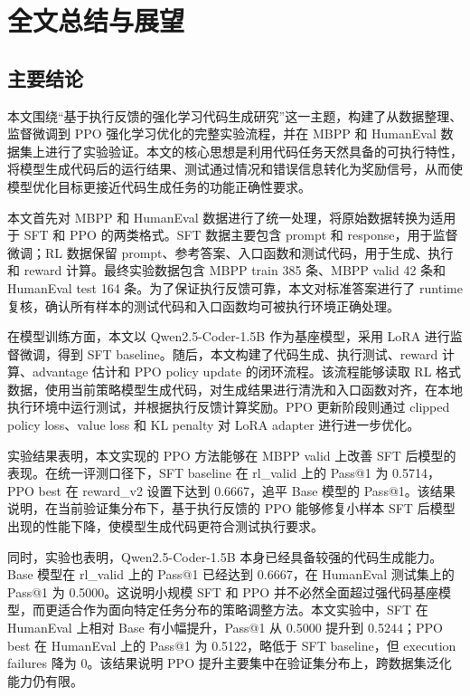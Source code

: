 
\chapter{全文总结与展望}

\section{主要结论}

本文围绕“基于执行反馈的强化学习代码生成研究”这一主题，构建了从数据整理、监督微调到 PPO 强化学习优化的完整实验流程，并在 MBPP 和 HumanEval 数据集上进行了实验验证。本文的核心思想是利用代码任务天然具备的可执行特性，将模型生成代码后的运行结果、测试通过情况和错误信息转化为奖励信号，从而使模型优化目标更接近代码生成任务的功能正确性要求。

本文首先对 MBPP 和 HumanEval 数据进行了统一处理，将原始数据转换为适用于 SFT 和 PPO 的两类格式。SFT 数据主要包含 prompt 和 response，用于监督微调；RL 数据保留 prompt、参考答案、入口函数和测试代码，用于生成、执行和 reward 计算。最终实验数据包含 MBPP train 385 条、MBPP valid 42 条和 HumanEval test 164 条。为了保证执行反馈可靠，本文对标准答案进行了 runtime 复核，确认所有样本的测试代码和入口函数均可被执行环境正确处理。

在模型训练方面，本文以 Qwen2.5-Coder-1.5B 作为基座模型，采用 LoRA 进行监督微调，得到 SFT baseline。随后，本文构建了代码生成、执行测试、reward 计算、advantage 估计和 PPO policy update 的闭环流程。该流程能够读取 RL 格式数据，使用当前策略模型生成代码，对生成结果进行清洗和入口函数对齐，在本地执行环境中运行测试，并根据执行反馈计算奖励。PPO 更新阶段则通过 clipped policy loss、value loss 和 KL penalty 对 LoRA adapter 进行进一步优化。

实验结果表明，本文实现的 PPO 方法能够在 MBPP valid 上改善 SFT 后模型的表现。在统一评测口径下，SFT baseline 在 rl\_valid 上的 Pass@1 为 0.5714，PPO best 在 reward\_v2 设置下达到 0.6667，追平 Base 模型的 Pass@1。该结果说明，在当前验证集分布下，基于执行反馈的 PPO 能够修复小样本 SFT 后模型出现的性能下降，使模型生成代码更符合测试执行要求。

同时，实验也表明，Qwen2.5-Coder-1.5B 本身已经具备较强的代码生成能力。Base 模型在 rl\_valid 上的 Pass@1 已经达到 0.6667，在 HumanEval 测试集上的 Pass@1 为 0.5000。这说明小规模 SFT 和 PPO 并不必然全面超过强代码基座模型，而更适合作为面向特定任务分布的策略调整方法。本文实验中，SFT 在 HumanEval 上相对 Base 有小幅提升，Pass@1 从 0.5000 提升到 0.5244；PPO best 在 HumanEval 上的 Pass@1 为 0.5122，略低于 SFT baseline，但 execution failures 降为 0。该结果说明 PPO 提升主要集中在验证集分布上，跨数据集泛化能力仍有限。

